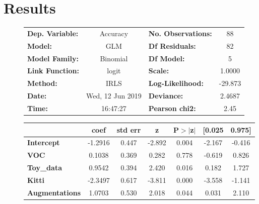 \section{Results}

\begin{figure}[!htb]
	\centering
	\begin{center}
		\begin{tabular}{lclc}
			\toprule
			\textbf{Dep. Variable:} &     Accuracy     & \textbf{  No. Observations:  } &       88    \\
			\textbf{Model:}         &       GLM        & \textbf{  Df Residuals:      } &       82    \\
			\textbf{Model Family:}  &     Binomial     & \textbf{  Df Model:          } &        5    \\
			\textbf{Link Function:} &      logit       & \textbf{  Scale:             } &    1.0000   \\
			\textbf{Method:}        &       IRLS       & \textbf{  Log-Likelihood:    } &   -29.873   \\
			\textbf{Date:}          & Wed, 12 Jun 2019 & \textbf{  Deviance:          } &    2.4687   \\
			\textbf{Time:}          &     16:47:27     & \textbf{  Pearson chi2:      } &     2.45    \\
			\bottomrule
		\end{tabular}
		\begin{tabular}{lcccccc}
			& \textbf{coef} & \textbf{std err} & \textbf{z} & \textbf{P$>$$|$z$|$} & \textbf{[0.025} & \textbf{0.975]}  \\
			\midrule
			\textbf{Intercept}     &      -1.2916  &        0.447     &    -2.892  &         0.004        &       -2.167    &       -0.416     \\
			\textbf{VOC}           &       0.1038  &        0.369     &     0.282  &         0.778        &       -0.619    &        0.826     \\
			\textbf{Toy\_data}     &       0.9542  &        0.394     &     2.420  &         0.016        &        0.182    &        1.727     \\
			\textbf{Kitti}         &      -2.3497  &        0.617     &    -3.811  &         0.000        &       -3.558    &       -1.141     \\
			\textbf{Augmentations} &       1.0703  &        0.530     &     2.018  &         0.044        &        0.031    &        2.110     \\

\end{tabular}
\end{center}
\end{figure}
